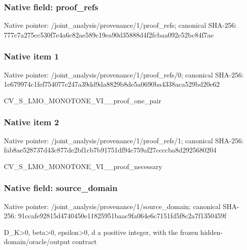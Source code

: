 \documentclass[10pt,a4paper]{article}
\begin{document}
\subsubsection{Native field: proof\_\allowbreak{}refs}
Native pointer: /joint\_\allowbreak{}analysis/provenance/1/proof\_\allowbreak{}refs; canonical SHA-256: 777c7a275cc530f7e4a6c82ae589c19ea90d35888d4f2fcbaa092c52bc84f7ae

\subsubsection{Native item 1}
Native pointer: /joint\_\allowbreak{}analysis/provenance/1/proof\_\allowbreak{}refs/0; canonical SHA-256: 1e679974c1fef754077c247a39dd9da8829b8de5a0690ba4338aca529bd20e62

\begingroup\raggedright\sloppy CV\_\allowbreak{}S\_\allowbreak{}LMO\_\allowbreak{}MONOTONE\_\allowbreak{}VI\_\allowbreak{}\_\allowbreak{}proof\_\allowbreak{}one\_\allowbreak{}pair\par\endgroup

\subsubsection{Native item 2}
Native pointer: /joint\_\allowbreak{}analysis/provenance/1/proof\_\allowbreak{}refs/1; canonical SHA-256: fab8ae528737d43c877de2bf1cb7b91751df94c759af27ccccba8d2925680204

\begingroup\raggedright\sloppy CV\_\allowbreak{}S\_\allowbreak{}LMO\_\allowbreak{}MONOTONE\_\allowbreak{}VI\_\allowbreak{}\_\allowbreak{}proof\_\allowbreak{}necessary\par\endgroup

\subsubsection{Native field: source\_\allowbreak{}domain}
Native pointer: /joint\_\allowbreak{}analysis/provenance/1/source\_\allowbreak{}domain; canonical SHA-256: 91ccafe92815d4740450e11825951baac9fa064e6c7151fd5f8c2a7f1350459f

\begingroup\raggedright\sloppy D\_\allowbreak{}K>0,\allowbreak{} beta>0,\allowbreak{} epsilon>0,\allowbreak{} d a positive integer,\allowbreak{} with the frozen hidden-domain/\allowbreak{}oracle/\allowbreak{}output contract\par\endgroup
\end{document}
